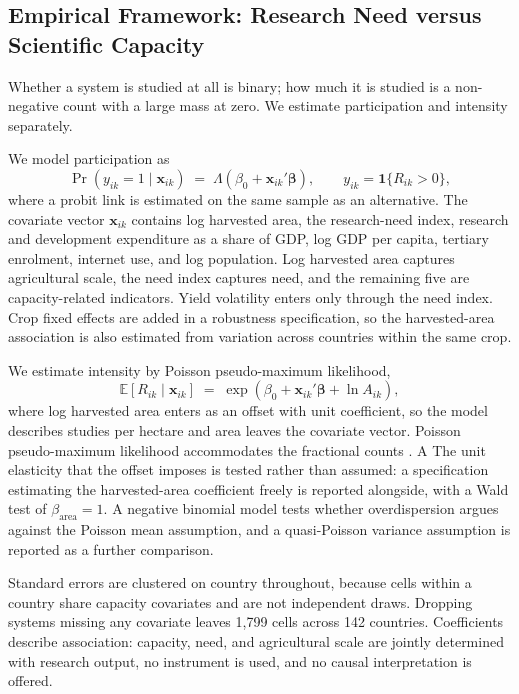 \documentclass[ASNA,twocolumn]{USG}
\begin{document}
\subsection{Empirical Framework: Research Need versus Scientific Capacity}\label{sec:framework}

Whether a system is studied at all is binary; how much it is studied is a non-negative count with
a large mass at zero. We estimate participation and intensity separately.

We model participation as
\begin{equation}
\Pr(y_{ik}=1 \mid \mathbf{x}_{ik}) \;=\; \Lambda\!\left(\beta_{0} + \mathbf{x}_{ik}'\boldsymbol{\beta}\right),
\qquad y_{ik} = \mathbf{1}\{R_{ik}>0\},
\label{eq:logit}
\end{equation}
where a probit link is estimated on the same sample
as an alternative. The covariate vector $\mathbf{x}_{ik}$ contains log harvested area, the
research-need index, research and development expenditure as a share of GDP, log GDP per
capita, tertiary enrolment, internet use, and log population. Log harvested area captures agricultural scale, the need index captures need, and the remaining
five are capacity-related indicators. Yield volatility enters only through the need index. Crop fixed effects are added in a robustness specification, so the
harvested-area association is also estimated from variation across countries within the same
crop.

We estimate intensity by Poisson pseudo-maximum likelihood,
\begin{equation}
\mathbb{E}\!\left[R_{ik} \mid \mathbf{x}_{ik}\right] \;=\;
\exp\!\left(\beta_{0} + \mathbf{x}_{ik}'\boldsymbol{\beta} + \ln A_{ik}\right),
\label{eq:ppml}
\end{equation}
where log harvested area enters as an offset with unit coefficient, so the model describes
studies per hectare and area leaves the covariate vector. Poisson pseudo-maximum likelihood accommodates the fractional counts \cite{SilvaTenreyro2006}. A
The unit elasticity that the offset imposes is tested rather than assumed: a specification
estimating the harvested-area coefficient freely is reported alongside, with a Wald test of
$\beta_{\text{area}} = 1$. A negative binomial model tests whether overdispersion argues against
the Poisson mean assumption, and a quasi-Poisson variance assumption is reported as a further
comparison.

Standard errors are clustered on country throughout, because cells within a country share
capacity covariates and are not independent draws. Dropping systems missing any covariate leaves 1,799 cells across 142 countries. Coefficients describe association: capacity, need,
and agricultural scale are jointly determined with research output, no instrument is used, and
no causal interpretation is offered.
\end{document}
